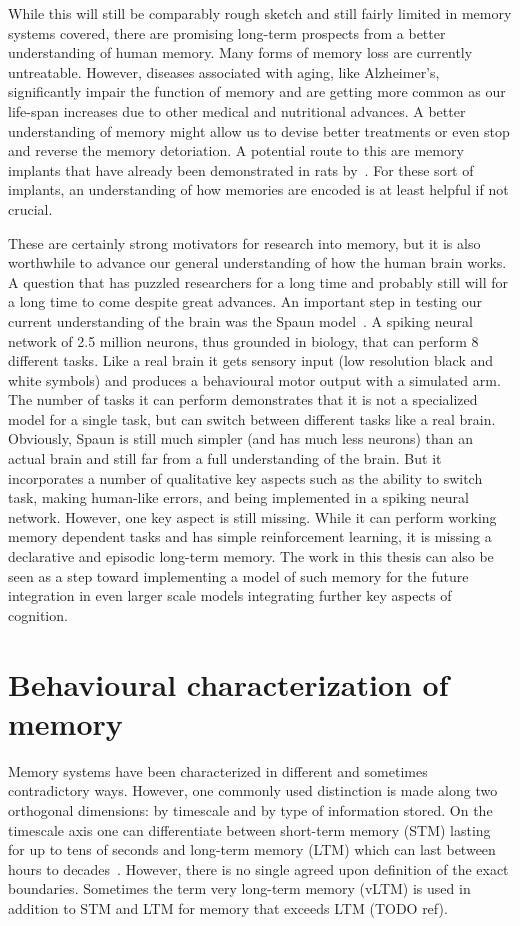 While this will still be comparably rough sketch and still fairly limited in memory systems covered, there are promising long-term prospects from a better understanding of human memory.
Many forms of memory loss are currently untreatable.
However, diseases associated with aging, like Alzheimer's, significantly impair the function of memory and are getting more common as our life-span increases due to other medical and nutritional advances.
A better understanding of memory might allow us to devise better treatments or even stop and reverse the memory detoriation.
A potential route to this are memory implants that have already been demonstrated in rats by~\textcite{Berger2011}.
For these sort of implants, an understanding of how memories are encoded is at least helpful if not crucial.

These are certainly strong motivators for research into memory, but it is also worthwhile to advance our general understanding of how the human brain works.
A question that has puzzled researchers for a long time and probably still will for a long time to come despite great advances.
An important step in testing our current understanding of the brain was the Spaun model~\parencite{Eliasmith2012}.
A spiking neural network of 2.5 million neurons, thus grounded in biology, that can perform 8 different tasks.
Like a real brain it gets sensory input (low resolution black and white symbols) and produces a behavioural motor output with a simulated arm.
The number of tasks it can perform demonstrates that it is not a specialized model for a single task, but can switch between different tasks like a real brain.
Obviously, Spaun is still much simpler (and has much less neurons) than an actual brain and still far from a full understanding of the brain.
But it incorporates a number of qualitative key aspects such as the ability to switch task, making human-like errors, and being implemented in a spiking neural network.
However, one key aspect is still missing.
While it can perform working memory dependent tasks and has simple reinforcement learning, it is missing a declarative and episodic long-term memory.
The work in this thesis can also be seen as a step toward implementing a model of such memory for the future integration in even larger scale models integrating further key aspects of cognition.


\section{Behavioural characterization of memory}
Memory systems have been characterized in different and sometimes contradictory ways.
However, one commonly used distinction is made along two orthogonal dimensions:
by timescale and by type of information stored.
On the timescale axis one can differentiate between short-term memory (STM) lasting for up to tens of seconds and long-term memory (LTM) which can last between hours to decades~\parencite{chaudhuri2016}.
However, there is no single agreed upon definition of the exact boundaries.
Sometimes the term very long-term memory (vLTM) is used in addition to STM and LTM for memory that exceeds LTM (TODO ref).

